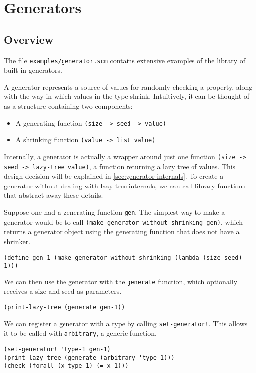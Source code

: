 \documentclass{scrartcl}
\begin{document}
\section{Generators}\label{sec:generators}
\subsection{Overview}

The file \verb|examples/generator.scm| contains extensive examples of the
library of built-in generators.

A generator represents a source of values for randomly checking a property,
along with the way in which values in the type shrink.
Intuitively, it can be thought of as a structure containing two components:
\begin{itemize}
\item A generating function \verb|(size -> seed -> value)|
\item A shrinking function \verb|(value -> list value)|
\end{itemize}
Internally, a generator is actually a wrapper around just one function
\verb|(size -> seed -> lazy-tree value)|, a function returning a lazy tree of
values. This design decision will be explained in
\cref{sec:generator-internals}.
To create a generator without dealing with lazy tree internals,
we can call library functions that abstract away these details.

Suppose one had a generating function \verb|gen|. The simplest way to make a
generator would be to call \verb|(make-generator-without-shrinking gen)|,
which returns a generator object using the generating function that does not
have a shrinker.
\begin{verbatim}
(define gen-1 (make-generator-without-shrinking (lambda (size seed) 1)))
\end{verbatim}

We can then use the generator with the \verb|generate| function,
which optionally receives a size and seed as parameters.
\begin{verbatim}
(print-lazy-tree (generate gen-1))
\end{verbatim}

We can register a generator with a type by calling \verb|set-generator!|. This
allows it to be called with \verb|arbitrary|, a generic function.

\begin{verbatim}
(set-generator! 'type-1 gen-1)
(print-lazy-tree (generate (arbitrary 'type-1)))
(check (forall (x type-1) (= x 1)))
\end{verbatim}
\end{document}
